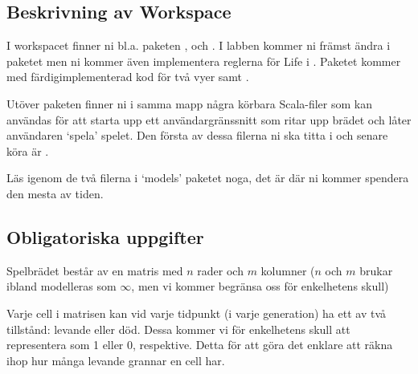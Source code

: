 \subsection{Beskrivning av Workspace}

I workspacet finner ni bl.a. paketen ,  och . I labben kommer ni främst ändra i  paketet men ni kommer även implementera reglerna för Life i . Paketet  kommer med färdigimplementerad kod för två vyer  samt .

Utöver paketen finner ni i samma mapp några körbara Scala-filer som kan användas för att starta upp ett användargränssnitt som ritar upp brädet och låter användaren `spela' spelet. Den första av dessa filerna ni ska titta i och senare köra är .

Läs igenom de två filerna i `models' paketet noga, det är där ni kommer spendera den mesta av tiden.


\subsection{Obligatoriska uppgifter}


    
	Spelbrädet består av en matris med $n$ rader och $m$ kolumner ($n$ och $m$ brukar ibland modelleras som $\infty$, men vi kommer begränsa oss för enkelhetens skull)

	Varje cell i matrisen kan vid varje tidpunkt (i varje generation) ha ett av två tillstånd: levande eller död. Dessa kommer vi för enkelhetens skull att representera som 1 eller 0, respektive. Detta för att göra det enklare att räkna ihop hur många levande grannar en cell har.

